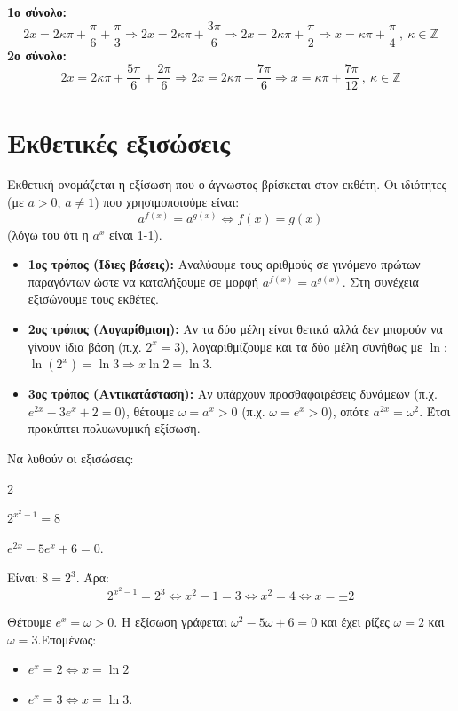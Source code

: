 \textbf{1ο σύνολο:} 
\[ 2x = 2\kappa\pi + \dfrac{\pi}{6} + \dfrac{\pi}{3} \Rightarrow 2x = 2\kappa\pi + \dfrac{3\pi}{6} \Rightarrow 2x = 2\kappa\pi + \dfrac{\pi}{2} \Rightarrow {x = \kappa\pi + \dfrac{\pi}{4}}\ ,\ \kappa\in\mathbb{Z} \]
\textbf{2ο σύνολο:} 
\[ 2x = 2\kappa\pi + \dfrac{5\pi}{6} + \dfrac{2\pi}{6} \Rightarrow 2x = 2\kappa\pi + \dfrac{7\pi}{6} \Rightarrow {x = \kappa\pi + \dfrac{7\pi}{12}}\ ,\ \kappa\in\mathbb{Z} \]

\section{Εκθετικές εξισώσεις}

Εκθετική ονομάζεται η εξίσωση που ο άγνωστος βρίσκεται στον εκθέτη. 
Οι ιδιότητες (με $a > 0$, $a \neq 1$) που χρησιμοποιούμε είναι:
\[ a^{f(x)} = a^{g(x)} \Leftrightarrow f(x) = g(x) \]
(λόγω του ότι η $a^x$ είναι 1-1). 

\begin{itemize}
    \item \textbf{1ος τρόπος (Ίδιες βάσεις):} Αναλύουμε τους αριθμούς σε γινόμενο πρώτων παραγόντων ώστε να καταλήξουμε σε μορφή $a^{f(x)} = a^{g(x)}$. Στη συνέχεια εξισώνουμε τους εκθέτες.
    \item \textbf{2ος τρόπος (Λογαρίθμιση):} Αν τα δύο μέλη είναι θετικά αλλά δεν μπορούν να γίνουν ίδια βάση (π.χ. $2^x = 3$), λογαριθμίζουμε και τα δύο μέλη συνήθως με $\ln$: $\ln(2^x) = \ln 3 \Rightarrow x \ln 2 = \ln 3$.
    \item \textbf{3ος τρόπος (Αντικατάσταση):} Αν υπάρχουν προσθαφαιρέσεις δυνάμεων (π.χ. $e^{2x} - 3e^x + 2 = 0$), θέτουμε $\omega = a^x > 0$ (π.χ. $\omega = e^x > 0$), οπότε $a^{2x} = \omega^2$. Έτσι προκύπτει πολυωνυμική εξίσωση.
\end{itemize}


Να λυθούν οι εξισώσεις: 
\begin{multicols}{2}
\begin{alist}
\item $2^{x^2 - 1} = 8$
\item $e^{2x} - 5e^x + 6 = 0$.
\end{alist}
\end{multicols}

\lysh\vspace{-5mm}
\begin{alist}
\item Είναι: $8 = 2^3$. Άρα:
\[ 2^{x^2 - 1} = 2^3 \Leftrightarrow x^2 - 1 = 3 \Leftrightarrow x^2 = 4 \Leftrightarrow x = \pm 2 \]
\item Θέτουμε $e^x = \omega > 0$. Η εξίσωση γράφεται $\omega^2-5\omega+6=0$ και έχει ρίζες $\omega=2$ και $\omega=3$.Επομένως: 
\begin{itemize}
\item $e^x = 2 \Leftrightarrow x = \ln 2$
\item $e^x = 3 \Leftrightarrow x = \ln 3$.
\end{itemize}
\end{alist}

